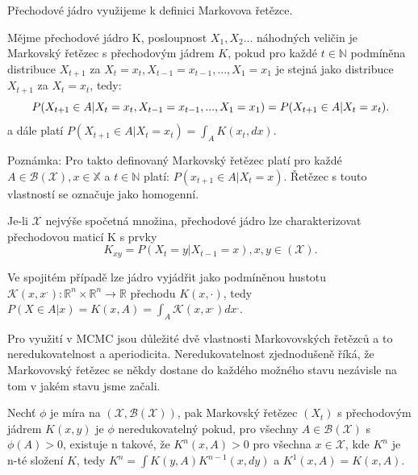 \documentclass[czech,master,public,dept470,male,cpdeclaration,oneside, python]{diploma}
\begin{document}
Přechodové jádro využijeme k definici Markovova řetězce.

\begin{definition}
	Mějme přechodové jádro K, posloupnost $X_1, X_2 ...$ náhodných veličin je Markovský řetězec s přechodovým jádrem $K$, pokud pro každé $t \in \mathbb{N}$ podmíněna distribuce $X_{t+1}$ za $X_t = x_{t}, X_{t-1}=x_{t-1}, ..., X_1 = x_1$ je stejná jako distribuce $X_{t+1}$ za $X_t = x_t$, tedy:
	\begin{equation*}
		P(X_{t+1} \in A| X_t = x_{t}, X_{t-1}=x_{t-1}, ..., X_1 = x_1) = P(X_{t+1} \in A| X_t = x_t) \\.
	\end{equation*}
	a dále platí $ P(X_{t+1} \in A| X_t = x_t) = \int_A K(x_t, dx)$. \\

\end{definition} \par
Poznámka: Pro takto definovaný Markovský řetězec platí pro každé $A \in \mathcal{B}(\mathcal{X}), x \in \mathbb{X}$ a $t \in \mathbb{N}$ platí: $P(x_{t+1} \in A | X_t = x)$. Řetězec s touto vlastností se označuje jako homogenní. \par
Je-li $\mathcal{X}$ nejvýše spočetná množina, přechodové jádro lze charakterizovat přechodovou maticí K s prvky
\begin{equation*}
K_{xy} = P(X_t = y| X_{t-1} = x), x, y \in (\mathcal{X}).
\end{equation*}

Ve spojitém případě lze jádro vyjádřit jako podmíněnou hustotu $\mathcal{K}(x, x^{,}):\mathbb{R}^n \times \mathbb{R}^n \rightarrow \mathbb{R}$ přechodu $K(x, \cdot)$, tedy $P(X \in A| x) = K(x, A) = \int_A \mathcal{K}(x, x^{,}) dx^{,}$. 


Pro využití v MCMC jsou důležité dvě vlastnosti Markovovských řetězců a to neredukovatelnost a aperiodicita. Neredukovatelnost zjednodušeně říká, že Markovovský řetězec se někdy dostane do každého možného stavu nezávisle na tom v jakém stavu jsme začali.
\begin{definition}
	Nechť $\phi$ je míra na $(\mathcal{X}, \mathcal{B}(\mathcal{X}))$, pak Markovský řetězec $(X_t)$ s přechodovým jádrem $K(x,y)$ je $\phi$ 
	neredukovatelný pokud, pro všechny $A \in \mathcal{B}(\mathcal{X})$ s $\phi(A) > 0$, existuje n takové, že $K^n(x, A) > 0$ pro všechna $x \in \mathcal{X}$, kde $K^n$ je n-té složení $K$, tedy $K^n = \int K(y, A)K^{n-1}(x, dy)$ a $K^1(x, A) = K(x, A)$.  \\
\end{definition}
\end{document}
